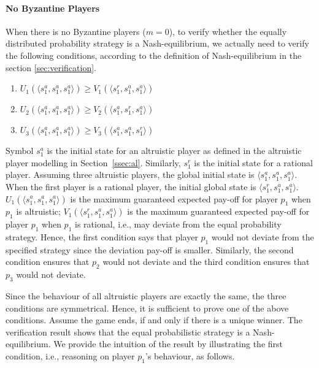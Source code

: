 \paragraph{No Byzantine Players}
When there is no Byzantine players ($m=0$), to verify whether the equally distributed probability strategy is a Nash-equilibrium, we actually need to 
verify the following conditions, according to the definition of Nash-equilibrium in the section \ref{sec:verification}.
\begin{enumerate}
\item
$U_1(\langle s_1^a,s_1^a,s_1^a \rangle ) \geq V_1(\langle s_1^r,s_1^a,s_1^a  \rangle )$
\item
$U_2(\langle s_1^a,s_1^a,s_1^a  \rangle ) \geq V_2(\langle s_1^a,s_1^r,s_1^a  \rangle )$
\item
$U_3(\langle s_1^a,s_1^a,s_1^a  \rangle ) \geq V_3(\langle s_1^a,s_1^a,s_1^r  \rangle )$
\end{enumerate}
Symbol $s_1^a$ is the initial state for an altruistic player as defined in the altruistic player modelling in Section~\ref{ssec:al}.
Similarly, $s_1^r$ is the initial state for a rational player. Assuming three altruistic players, the global initial state is $\langle s_1^a,s_1^a,s_1^a \rangle$. When the first player is a rational player, the initial global state is $\langle s_1^r,s_1^a,s_1^a  \rangle$. 
$U_1(\langle s_1^a,s_1^a,s_1^a \rangle )$ is the maximum guaranteed expected pay-off for player $p_1$ when $p_1$ is altruistic; $V_1(\langle s_1^r,s_1^a,s_1^a  \rangle )$ is the maximum guaranteed expected pay-off for player $p_1$ when $p_1$ is rational, i.e., may deviate from the equal probability strategy. Hence, the first condition says that player $p_1$ would not deviate from the specified strategy since the deviation pay-off
is smaller. Similarly, the second condition ensures that $p_2$ would not deviate and the third condition ensures that $p_3$ would not deviate.

Since the behaviour of all altruistic players are exactly the same, the three conditions are symmetrical. Hence, it is sufficient to prove one of the above conditions. Assume the game ends, if and only if there is a unique winner.
The verification result shows that the equal probabilistic strategy is a Nash-equilibrium. We provide the intuition of the result by illustrating the first condition, i.e., reasoning on player $p_1$'s behaviour, as follows.

